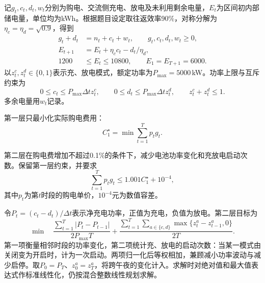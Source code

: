 记$g_t,c_t,d_t,w_t$分别为购电、交流侧充电、放电及未利用剩余电量，$E_t$为区间初内部储电量，单位均为kWh。根据题目设定取往返效率90\%，对称分解为$\eta_c=\eta_d=\sqrt{0.9}$，得到
\begin{equation}\label{eq:q1-balance}
 \begin{aligned}
 g_t+d_t&=n_t+c_t+w_t,\qquad g_t,c_t,d_t,w_t\geq0,\\
 E_{t+1}&=E_t+\eta_c c_t-d_t/\eta_d,\\
 1200&\leq E_t\leq10800,\qquad E_1=E_{T+1}=6000.
 \end{aligned}
\end{equation}
以$z_t^c,z_t^d\in\{0,1\}$表示充、放电模式，额定功率为$P_{\max}=5000$\,kW。功率上限与互斥约束为
\begin{equation}\label{eq:q1-mode}
 0\leq c_t\leq P_{\max}\Delta t z_t^c,\qquad
 0\leq d_t\leq P_{\max}\Delta t z_t^d,\qquad z_t^c+z_t^d\leq1.
\end{equation}
多余电量用$w_t$记录。



第一层只最小化实际购电费用：
\begin{equation}\label{eq:q1-first}
 C_1^\star=\min\sum_{t=1}^{T}p_tg_t.
\end{equation}

第二层在购电费增加不超过0.1\%的条件下，减少电池功率变化和充放电启动次数。保留第一层约束，并要求
\begin{equation}\label{eq:q1-budget}
 \sum_{t=1}^{T}p_tg_t\leq1.001C_1^\star+10^{-4},
\end{equation}
其中$p_t$为第$t$时段的购电单价，$10^{-4}$元为数值容差。

令$P_t=(c_t-d_t)/\Delta t$表示净充电功率，正值为充电，负值为放电。第二层目标为
\begin{equation}\label{eq:q1-second}
 \min\quad
 \frac{\sum_{t=1}^{T}|P_t-P_{t-1}|}{2P_{\max}T}
 +\frac{\sum_{t=1}^{T}\sum_{a\in\{c,d\}}
 \max\{z_t^a-z_{t-1}^a,0\}}{2T}.
\end{equation}
第一项衡量相邻时段的功率变化，第二项统计充、放电的启动次数：当某一模式由关闭变为开启时，计为一次启动。两项归一化后等权相加，兼顾减小功率波动与减少启停。取$P_0=P_T$、$z_0^a=z_T^a$，将跨午夜的变化计入。求解时对绝对值和最大值表达式作标准线性化，仍按混合整数线性规划求解。


